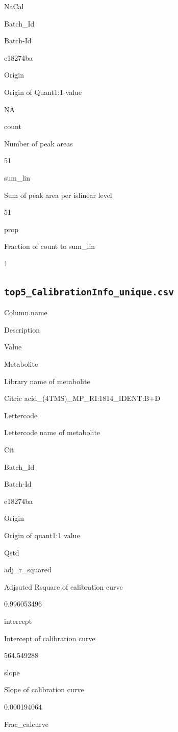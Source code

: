 \documentclass[]{book}
\theoremstyle{definition}
\theoremstyle{definition}
\theoremstyle{definition}
\theoremstyle{remark}
\begin{document}
NaCal

Batch\_Id

Batch-Id

e18274ba

Origin

Origin of Quant1:1-value

NA

count

Number of peak areas

51

sum\_lin

Sum of peak area per islinear level

51

prop

Fraction of count to sum\_lin

1

\subsection{\texorpdfstring{\texttt{top5\_CalibrationInfo\_unique.csv}}{top5\_CalibrationInfo\_unique.csv}}\label{top5_calibrationinfo_unique.csv}

Column.name

Description

Value

Metabolite

Library name of metabolite

Citric acid\_(4TMS)\_MP\_RI:1814\_IDENT:B+D

Lettercode

Lettercode name of metabolite

Cit

Batch\_Id

Batch-Id

e18274ba

Origin

Origin of quant1:1 value

Qstd

adj\_r\_squared

Adjsuted Rsquare of calibration curve

0.996053496

intercept

Intercept of calibration curve

564.549288

slope

Slope of calibration curve

0.000194064

Frac\_calcurve
\end{document}
